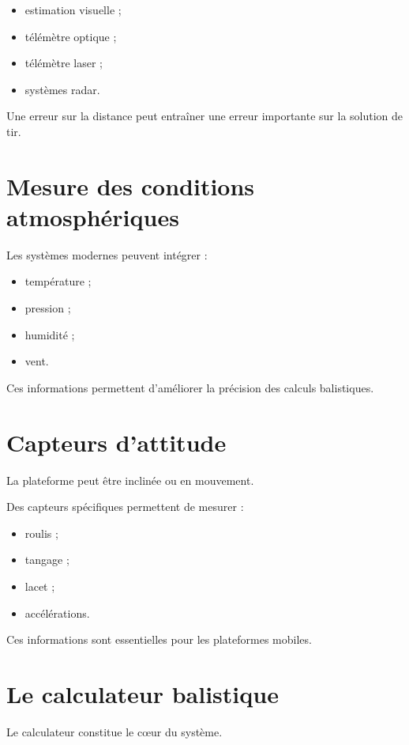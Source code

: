 \begin{itemize}
    \item estimation visuelle ;
    \item télémètre optique ;
    \item télémètre laser ;
    \item systèmes radar.
\end{itemize}

Une erreur sur la distance peut entraîner une erreur importante sur la
solution de tir.

\section{Mesure des conditions atmosphériques}

Les systèmes modernes peuvent intégrer :

\begin{itemize}
    \item température ;
    \item pression ;
    \item humidité ;
    \item vent.
\end{itemize}

Ces informations permettent d'améliorer la précision des calculs
balistiques.

\section{Capteurs d'attitude}

La plateforme peut être inclinée ou en mouvement.

Des capteurs spécifiques permettent de mesurer :

\begin{itemize}
    \item roulis ;
    \item tangage ;
    \item lacet ;
    \item accélérations.
\end{itemize}

Ces informations sont essentielles pour les plateformes mobiles.

\section{Le calculateur balistique}

Le calculateur constitue le cœur du système.

